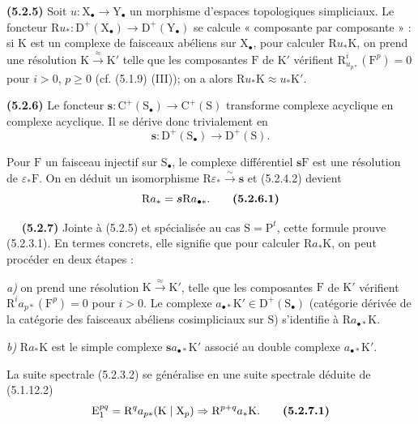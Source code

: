 \documentclass[11pt,leqno]{article}
\newcommand{\Page}[1]{\ifvmode\noindent\else\unskip\ \fi{\footnotesize\textcolor{gray}{[p.\,#1]}}\ \ignorespaces}
\begin{document}
\textbf{(5.2.5)} Soit \(u:\mathrm{X}_{\bullet}\to\mathrm{Y}_{\bullet}\) un morphisme d’espaces topologiques simpliciaux. Le foncteur \(\mathrm{R}u_*:\mathrm{D}^{+}(\mathrm{X}_{\bullet})\to\mathrm{D}^{+}(\mathrm{Y}_{\bullet})\) se calcule « composante par composante » : si \(\mathrm{K}\) est un complexe de faisceaux abéliens sur \(\mathrm{X}_{\bullet}\), pour calculer \(\mathrm{R}u_*\mathrm{K}\), on prend une résolution \(\mathrm{K}\xrightarrow{\approx}\mathrm{K}'\) telle que les composantes \(\mathrm{F}\) de \(\mathrm{K}'\) vérifient \(\mathrm{R}^{i}_{u_{p*}}(\mathrm{F}^{p})=0\) pour \(i>0\), \(p\geq 0\) (cf. (5.1.9) (III)); on a alors \(\mathrm{R}u_*\mathrm{K}\approx u_*\mathrm{K}'\).

\textbf{(5.2.6)} Le foncteur \(\boldsymbol{s}:\mathrm{C}^{+}(\mathrm{S}_{\bullet})\to\mathrm{C}^{+}(\mathrm{S})\) transforme complexe acyclique en complexe acyclique. Il se dérive donc trivialement en
\[
\boldsymbol{s}:\mathrm{D}^{+}(\mathrm{S}_{\bullet})\to\mathrm{D}^{+}(\mathrm{S}).
\]

Pour \(\mathrm{F}\) un faisceau injectif sur \(\mathrm{S}_{\bullet}\), le complexe différentiel \(\boldsymbol{s}\mathrm{F}\) est une résolution de \(\varepsilon_*\mathrm{F}\). On en déduit un isomorphisme \(\mathrm{R}\varepsilon_*\xrightarrow{\sim}\boldsymbol{s}\) et (5.2.4.2) devient
\[
\mathrm{R}a_*=\boldsymbol{s}\mathrm{R}a_{\bullet *}.
\tag*{\textbf{(5.2.6.1)}}
\]

\Page{14}
\textbf{(5.2.7)} Jointe à (5.2.5) et spécialisée au cas \(\mathrm{S}=\mathrm{P}^{t}\), cette formule prouve (5.2.3.1). En termes concrets, elle signifie que pour calculer \(\mathrm{R}a_*\mathrm{K}\), on peut procéder en deux étapes :

\textit{a)} on prend une résolution \(\mathrm{K}\xrightarrow{\approx}\mathrm{K}'\), telle que les composantes \(\mathrm{F}\) de \(\mathrm{K}'\) vérifient \(\mathrm{R}^{i}a_{p*}(\mathrm{F}^{p})=0\) pour \(i>0\). Le complexe \(a_{\bullet *}\mathrm{K}'\in\mathrm{D}^{+}(\mathrm{S}_{\bullet})\) (catégorie dérivée de la catégorie des faisceaux abéliens cosimpliciaux sur \(\mathrm{S}\)) s’identifie à \(\mathrm{R}a_{\bullet *}\mathrm{K}\).

\textit{b)} \(\mathrm{R}a_*\mathrm{K}\) est le simple complexe \(\boldsymbol{s}a_{\bullet *}\mathrm{K}'\) associé au double complexe \(a_{\bullet *}\mathrm{K}'\).

La suite spectrale (5.2.3.2) se généralise en une suite spectrale déduite de (5.1.12.2)
\[
\mathrm{E}_{1}^{pq}=\mathrm{R}^{q}a_{p*}(\mathrm{K}\mid\mathrm{X}_{p})
\Rightarrow \mathrm{R}^{p+q}a_*\mathrm{K}.
\tag*{\textbf{(5.2.7.1)}}
\]
\end{document}
